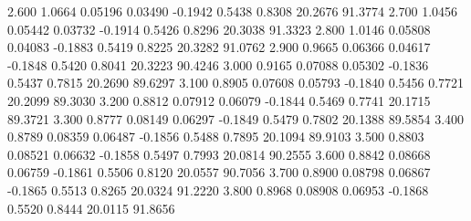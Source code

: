    2.600   1.0664   0.05196   0.03490  -0.1942   0.5438   0.8308  20.2676  91.3774
   2.700   1.0456   0.05442   0.03732  -0.1914   0.5426   0.8296  20.3038  91.3323
   2.800   1.0146   0.05808   0.04083  -0.1883   0.5419   0.8225  20.3282  91.0762
   2.900   0.9665   0.06366   0.04617  -0.1848   0.5420   0.8041  20.3223  90.4246
   3.000   0.9165   0.07088   0.05302  -0.1836   0.5437   0.7815  20.2690  89.6297
   3.100   0.8905   0.07608   0.05793  -0.1840   0.5456   0.7721  20.2099  89.3030
   3.200   0.8812   0.07912   0.06079  -0.1844   0.5469   0.7741  20.1715  89.3721
   3.300   0.8777   0.08149   0.06297  -0.1849   0.5479   0.7802  20.1388  89.5854
   3.400   0.8789   0.08359   0.06487  -0.1856   0.5488   0.7895  20.1094  89.9103
   3.500   0.8803   0.08521   0.06632  -0.1858   0.5497   0.7993  20.0814  90.2555
   3.600   0.8842   0.08668   0.06759  -0.1861   0.5506   0.8120  20.0557  90.7056
   3.700   0.8900   0.08798   0.06867  -0.1865   0.5513   0.8265  20.0324  91.2220
   3.800   0.8968   0.08908   0.06953  -0.1868   0.5520   0.8444  20.0115  91.8656
